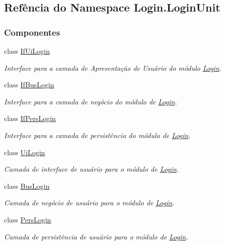 \hypertarget{namespaceLogin_1_1LoginUnit}{\subsection{Refência do Namespace Login.\-Login\-Unit}
\label{namespaceLogin_1_1LoginUnit}
}
\subsubsection*{Componentes}
\begin{DoxyCompactItemize}
\item 
class \hyperlink{classLogin_1_1LoginUnit_1_1IfUiLogin}{If\-Ui\-Login}
\begin{DoxyCompactList}\small\item\em Interface para a camada de Apresentação de Usuário do módulo \hyperlink{namespaceLogin}{Login}. \end{DoxyCompactList}\item 
class \hyperlink{classLogin_1_1LoginUnit_1_1IfBusLogin}{If\-Bus\-Login}
\begin{DoxyCompactList}\small\item\em Interface para a camada de negócio do módulo de \hyperlink{namespaceLogin}{Login}. \end{DoxyCompactList}\item 
class \hyperlink{classLogin_1_1LoginUnit_1_1IfPersLogin}{If\-Pers\-Login}
\begin{DoxyCompactList}\small\item\em Interface para a camada de persistência do módulo de \hyperlink{namespaceLogin}{Login}. \end{DoxyCompactList}\item 
class \hyperlink{classLogin_1_1LoginUnit_1_1UiLogin}{Ui\-Login}
\begin{DoxyCompactList}\small\item\em Camada de interface de usuário para o módulo de \hyperlink{namespaceLogin}{Login}. \end{DoxyCompactList}\item 
class \hyperlink{classLogin_1_1LoginUnit_1_1BusLogin}{Bus\-Login}
\begin{DoxyCompactList}\small\item\em Camada de negócio de usuário para o módulo de \hyperlink{namespaceLogin}{Login}. \end{DoxyCompactList}\item 
class \hyperlink{classLogin_1_1LoginUnit_1_1PersLogin}{Pers\-Login}
\begin{DoxyCompactList}\small\item\em Camada de persistência de usuário para o módulo de \hyperlink{namespaceLogin}{Login}. \end{DoxyCompactList}\end{DoxyCompactItemize}
